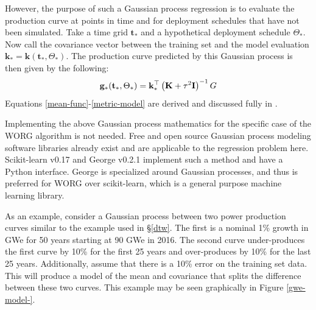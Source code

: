 However, the purpose of such a Gaussian process regression is to evaluate
the production curve at points in time and for deployment schedules that
have not been simulated. Take a time grid $\mathbf{t_*}$ and a hypothetical
deployment schedule $\Theta_*$. Now call the covariance vector between
the training set and the model evaluation
$\mathbf{k}_* = \mathbf{k}(\mathbf{t_*}, \Theta_*)$.
The production curve predicted by this Gaussian process is then given by
the following:
\begin{equation}
\label{metric-model}
\mathbf{g}_*(\mathbf{t}_*, \Theta_*) =
    \mathbf{k}_*^\top \left(\mathbf{K} + \tau^2\mathbf{I}\right)^{-1}G
\end{equation}
Equations \ref{mean-func}-\ref{metric-model} are derived and discussed fully
in \cite{rasmussen2006gaussian}.

Implementing the above Gaussian process mathematics for the specific
case of the WORG algorithm
is not needed.  Free and open source Gaussian process modeling software
libraries already exist and are applicable to the regression problem here.
Scikit-learn v0.17 \cite{scikit-learn} and George v0.2.1 \cite{hodlr}
implement such a method and have a Python interface. George is specialized
around Gaussian processes, and thus is preferred for WORG over scikit-learn,
which is a general purpose machine learning library.

As an example, consider a Gaussian process between two power production
curves similar to the example used in \S\ref{dtw}. The first is a nominal 1\% growth
in GWe for 50 years starting at
90 GWe in 2016. The second curve under-produces the first curve by 10\%
for the first 25 years and over-produces by 10\% for the last 25 years.
Additionally, assume that there is a 10\% error on the training set data.
This will produce a model of the mean and covariance that splits the
difference between these two curves. This example may be seen graphically
in Figure \ref{gwe-model-}.

